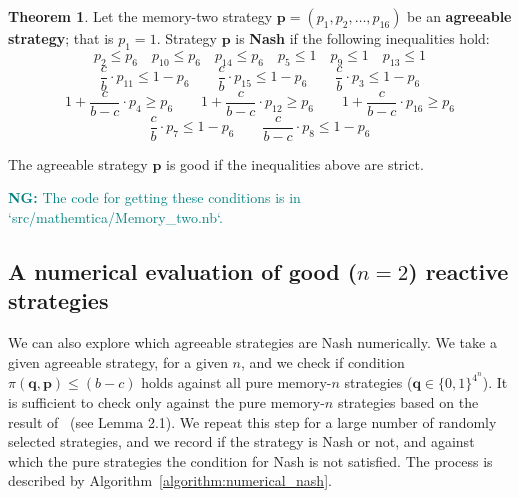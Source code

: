 \documentclass{article}
\theoremstyle{definition}
\newtheorem{theorem}{Theorem}[section]
\newcommand{\nikoleta}[1]{\textcolor{teal}{{\bf NG:} #1}}
\begin{document}
\begin{theorem}\label{theorem:memory_two_nash_and_good}
  Let the memory-two strategy \(\mathbf{p} = (p_{1}, p_{2}, \dots, p_{16})\) be an \textbf{agreeable
  strategy}; that is \(p_1 = 1\). Strategy \(\mathbf{p}\) is \textbf{Nash} if the
  following inequalities hold:
  \begin{equation*}
      p_2 \leq  p_{6} \quad p_{10} \leq  p_{6} \quad p_{14} \leq  p_{6}  \quad  p_5 \leq 1 \quad p_9 \leq 1 \quad p_{13}  \leq 1
  \end{equation*}
  \begin{equation*}
  \frac{c}{b} \cdot p_{11} \leq 1 - p_{6} \qquad \frac{c}{b} \cdot p_{15} \leq 1 - p_{6}  \qquad \frac{c}{b} \cdot p_{3} \leq 1 - p_{6}
\end{equation*}
  \begin{equation*}
    1 + \frac{c}{b\!-\!c} \cdot p_{4}  \geq p_6 \qquad  1 + \frac{c}{b\!-\!c} \cdot p_{12}  \geq p_6  \qquad 1 + \frac{c}{b\!-\!c} \cdot p_{16} \geq p_6
  \end{equation*}
  \begin{equation*}
        \frac{c}{b} \cdot p_{7} \leq 1 - p_6  \qquad \frac{c}{b -c} \cdot p_{8} \leq 1 - p_6
  \end{equation*}

  The agreeable strategy \(\mathbf{p}\) is good if the inequalities above are strict.
\end{theorem}

\nikoleta{The code for getting these conditions is in `src/mathemtica/Memory\_two.nb`.}

\subsection{A numerical evaluation of good (\(n=2\)) reactive strategies}\label{section:good_strategies_numerically}

We can also explore which agreeable strategies are Nash numerically. We take a
given agreeable strategy, for a given \(n\), and we check if condition
\(\pi({\mathbf{q}}, \mathbf{p}) \leq (b\!-\!c)\) holds against all pure
memory-\(n\) strategies (\(\mathbf{q} \in \{0, 1\}^{4 ^ n}\)). It is
sufficient to check only against the pure memory-\(n\) strategies based on the
result of~\citep{mcavoy:PRSA:2019} (see Lemma 2.1). We repeat this step for a
large number of randomly selected strategies, and we record if the strategy is
Nash or not, and against which the pure strategies the condition for Nash is not
satisfied. The process is described by Algorithm~\ref{algorithm:numerical_nash}.
\end{document}
